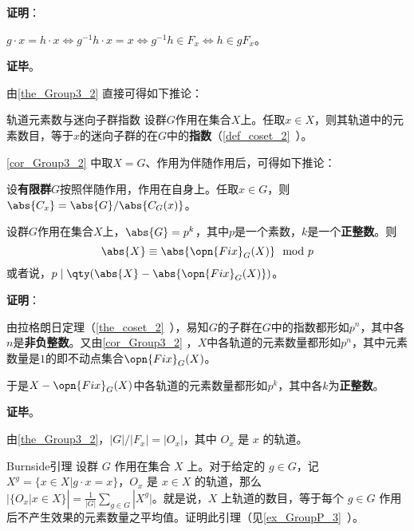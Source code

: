 \textbf{证明}：

 $g\cdot x=h\cdot x\iff g^{-1}h\cdot x=x\iff g^{-1}h\in F_x\iff h\in gF_x$。

\textbf{证毕}。






由\autoref{the_Group3_2} 直接可得如下推论：


\begin{corollary}{轨道元素数与迷向子群指数}\label{cor_Group3_2}
设群$G$作用在集合$X$上。任取$x\in X$，则其轨道中的元素数目，等于$x$的迷向子群的在$G$中的\textbf{指数}（\autoref{def_coset_2}~）。
\end{corollary}




\autoref{cor_Group3_2} 中取$X=G$、作用为伴随作用后，可得如下推论：

\begin{corollary}{}\label{cor_Group3_3}

设\textbf{有限群}$G$按照伴随作用，作用在自身上。任取$x\in G$，则$\abs{C_x}=\abs{G}/\abs{C_G(x)}$。

\end{corollary}




\begin{theorem}{}\label{the_Group3_5}
设群$G$作用在集合$X$上，$\abs{G}=p^k$，其中$p$是一个素数，$k$是一个\textbf{正整数}。则
\begin{equation}
\abs{X} \equiv \abs{\opn{Fix}_G(X)} \mod  p
\end{equation}
或者说，$p\mid \qty(\abs{X}-\abs{\opn{Fix}_G(X)})$。
\end{theorem}

\textbf{证明}：

由拉格朗日定理（\autoref{the_coset_2}~），易知$G$的子群在$G$中的指数都形如$p^n$，其中各$n$是\textbf{非负整数}。又由\autoref{cor_Group3_2} ，$X$中各轨道的元素数量都形如$p^n$，其中元素数量是$1$的即不动点集合$\opn{Fix}_G(X)$。

于是$X-\opn{Fix}_G(X)$中各轨道的元素数量都形如$p^k$，其中各$k$为\textbf{正整数}。

\textbf{证毕}。









\begin{corollary}{}\label{cor_Group3_1}
由\autoref{the_Group3_2}，$|G|/|F_x|=|O_x|$，其中 $O_x$ 是 $x$ 的轨道。
\end{corollary}

\begin{exercise}{Burnside引理}\label{exe_Group3_2}
设群 $G$ 作用在集合 $X$ 上。对于给定的 $g\in G$，记 $X^g=\{x\in X|g\cdot x=x\}$，$O_x$ 是 $x\in X$ 的轨道，那么 $|\{O_x|x\in X\}|=\frac{1}{|G|}\sum_{g\in G}|X^g|$。就是说，$X$ 上轨道的数目，等于每个 $g\in G$ 作用后不产生效果的元素数量之平均值。证明此引理（见\autoref{ex_GroupP_3}~）。
\end{exercise}
